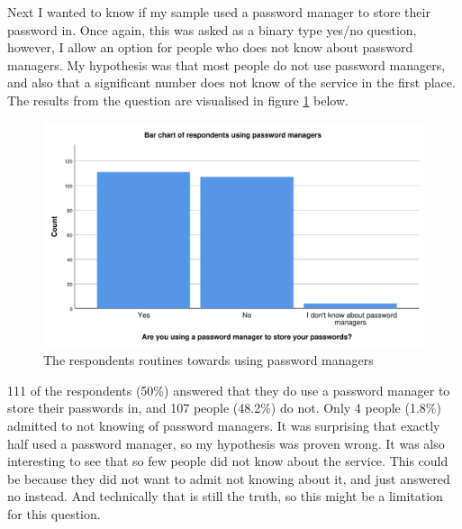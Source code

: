 Next I wanted to know if my sample used a password manager to store their password in. Once again, this was asked as a binary type yes/no question, however, I allow an option for people who does not know about password managers. My hypothesis was that most people do not use password managers, and also that a significant number does not know of the service in the first place. The results from the question are visualised in figure \ref{fig:password_manager} below. 
\begin{figure}[!h]
    \centering
    \includegraphics[scale=0.55]{figures/diagrams/password_manager.pdf}
    \caption{The respondents routines towards using password managers}
    \label{fig:password_manager}
\end{figure}
111 of the respondents (50\%) answered that they do use a password manager to store their passwords in, and 107 people (48.2\%) do not. Only 4 people (1.8\%) admitted to not knowing of password managers. It was surprising that exactly half used a password manager, so my hypothesis was proven wrong. It was also interesting to see that so few people did not know about the service. This could be because they did not want to admit not knowing about it, and just answered no instead. And technically that is still the truth, so this might be a limitation for this question. 

